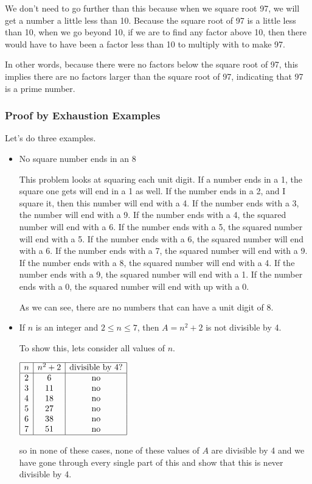 \documentclass[../maths.tex]{subfiles}
\begin{document}
We don't need to go further than this because when we square root 97, we will get a number a little less than 10. Because the square root of 97 is a little less than 10, 
when we go beyond 10, if we are to find any factor above 10, then there would have to have been a factor less than 10 to multiply with to make 97.

In other words, because there were no factors below the square root of 97, this implies there are no factors larger than the square root of 97, indicating that 97 is a prime number.

\subsubsection*{Proof by Exhaustion Examples}
Let's do three examples.

\begin{itemize}
    \item No square number ends in an 8
    
    This problem looks at squaring each unit digit. If a number ends in a 1, the square one gets will end in a 1 as well.
    If the number ends in a 2, and I square it, then this number will end with a 4. If the number ends with a 3, the number will end with a 9.
    If the number ends with a 4, the squared number will end with a 6. If the number ends with a 5, the squared number will end with a 5. 
    If the number ends with a 6, the squared number will end with a 6. If the number ends with a 7, the squared number will end with a 9.
    If the number ends with a 8, the squared number will end with a 4. If the number ends with a 9, the squared number will end with a 1.
    If the number ends with a 0, the squared number will end with up with a 0.
    
    As we can see, there are no numbers that can have a unit digit of 8.
\end{itemize}

\begin{itemize}
    \item If $n$ is an integer and $2\leq n\leq 7$, then $A=n^2+2$ is not divisible by 4.
    
    To show this, lets consider all values of $n$. 

    $\begin{array}{|c|c|c|}
    \hline 
    n & n^2+2 & \text{divisible by 4?} \\
    \hline 
    2 & 6 & \text{no} \\
    3 & 11 & \text{no} \\
    4 & 18 & \text{no} \\
    5 & 27 & \text{no} \\ 
    6 & 38 & \text{no} \\
    7 & 51 & \text{no} \\
    \hline
    \end{array}$
    
    so in none of these cases, none of these values of $A$ are divisible by 4 and we have gone through every single part of this and show that this is never divisible by 4.
\end{itemize}
\end{document}
